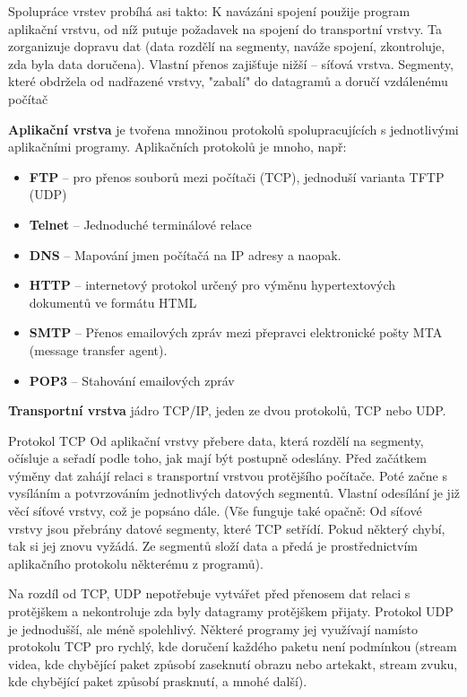
Spolupráce vrstev probíhá asi takto: K navázáni spojení použije program aplikační vrstvu, od níž putuje požadavek na spojení do transportní vrstvy. Ta zorganizuje dopravu dat (data rozdělí na segmenty, naváže spojení, zkontroluje, zda byla data doručena). Vlastní přenos zajišťuje nižší -- síťová vrstva. Segmenty, které obdržela od nadřazené vrstvy, "zabalí" do datagramů a doručí vzdálenému počítač

\textbf{Aplikační vrstva} je tvořena množinou protokolů spolupracujících s jednotlivými aplikačními programy. Aplikačních protokolů je mnoho, např:
\begin{itemize}
\item \textbf{FTP} -- pro přenos souborů mezi počítači (TCP), jednoduší varianta TFTP (UDP)
\item \textbf{Telnet} -- Jednoduché terminálové relace
\item \textbf{DNS} -- Mapování jmen počítačá na IP adresy a naopak.
\item \textbf{HTTP} -- internetový protokol určený pro výměnu hypertextových dokumentů ve formátu HTML
\item \textbf{SMTP} -- Přenos emailových zpráv mezi přepravci elektronické pošty MTA (message transfer agent).
\item \textbf{POP3} -- Stahování emailových zpráv
\end{itemize}

\textbf{Transportní vrstva} jádro TCP/IP, jeden ze dvou protokolů, TCP nebo UDP.

Protokol TCP Od aplikační vrstvy přebere data, která rozdělí na segmenty, očísluje a seřadí podle toho, jak mají být postupně odeslány. Před začátkem výměny dat zahájí relaci s transportní vrstvou protějšího počítače. Poté začne s vysíláním a potvrzováním jednotlivých datových segmentů. Vlastní odesílání je již věcí síťové vrstvy, což je popsáno dále. (Vše funguje také opačně: Od síťové vrstvy jsou přebrány datové segmenty, které TCP setřídí. Pokud některý chybí, tak si jej znovu vyžádá. Ze segmentů složí data a předá je prostřednictvím aplikačního protokolu některému z programů).

Na rozdíl od TCP, UDP nepotřebuje vytvářet před přenosem dat relaci s protějškem a nekontroluje zda byly datagramy protějškem přijaty.
Protokol UDP je jednodušší, ale méně spolehlivý. Některé programy jej využívají namísto protokolu TCP pro rychlý, kde doručení každého paketu není podmínkou (stream videa, kde chybějící paket způsobí zaseknutí obrazu nebo artekakt, stream zvuku, kde chybějící paket způsobí prasknutí, a mnohé další).

